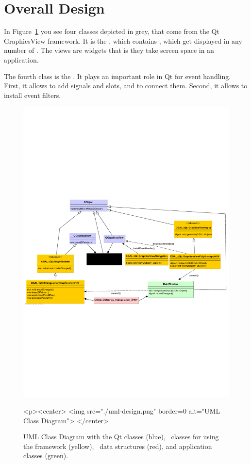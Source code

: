 \section{Overall Design}

In Figure~\ref{graphicsview:uml} you see four classes depicted in grey,
that come from the Qt GraphicsView framework. It is the ,
which contains , which get displayed in any number
of .   The views are widgets that is they take screen space
in an application.   

The fourth class is the . It plays an important role in Qt for
event handling. First, it allows to add signals and slots, and to connect them.
Second, it allows to install event filters. 


\begin{figure}[t]
\begin{ccTexOnly}
  \begin{center}
  \includegraphics{GraphicsView/uml-design.pdf}
  \end{center}
\end{ccTexOnly}
\begin{ccHtmlOnly}
  <p><center>
  <img src="./uml-design.png" border=0 alt="UML Class Diagram">
  </center>
\end{ccHtmlOnly}
\caption{UML Class Diagram with the Qt classes (blue), \cgal\ classes for using the framework (yellow),
\cgal\ data structures (red), and application classes (green). \label{graphicsview:uml}}
\end{figure}

